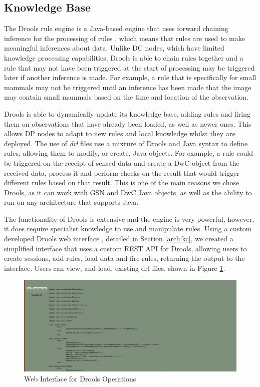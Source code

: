 		
	
	\subsection{Knowledge Base}\label{arch:kb}
	The Drools rule engine is a Java-based engine that uses forward chaining inference for the processing of rules \cite{proctor2005drools}, which means that rules are used to make meaningful inferences about data. Unlike DC nodes, which have limited knowledge processing capabilities, Drools is able to chain rules together and a rule that may not have been triggered at the start of processing may be triggered later if another inference is made. For example, a rule that is specifically for small mammals may not be triggered until an inference has been made that the image may contain small mammals based on the time and location of the observation.
	
	Drools is able to dynamically update its knowledge base, adding rules and firing them on observations that have already been loaded, as well as newer ones. This allows DP nodes to adapt to new rules and local knowledge whilst they are deployed. The use of \textit{drl} files use a mixture of Drools and Java syntax to define rules, allowing them to modify, or create, Java objects. For example, a rule could be triggered on the receipt of sensed data and create a DwC object from the received data, process it and perform checks on the result that would trigger different rules based on that result. This is one of the main reasons we chose Drools, as it can work with GSN and DwC Java objects, as well as the ability to run on any architecture that supports Java.
	
	The functionality of Drools is extensive and the engine is very powerful, however, it does require specialist knowledge to use and manipulate rules. Using a custom developed Drools web interface , detailed in Section \ref{arch:kc}, we created a simplified interface that uses a custom REST API for Drools, allowing users to create sessions, add rules, load data and fire rules, returning the output to the interface. Users can view, and load, existing drl files, shown in Figure \ref{kc:rloris_drl}. 
	
		\begin{figure}[h]
		\centering
		\includegraphics[width=\textwidth]{Chap4/figures/rules}
		\caption{Web Interface for Drools Operations}
		\label{kc:rloris_drl}
		\end{figure}
	
